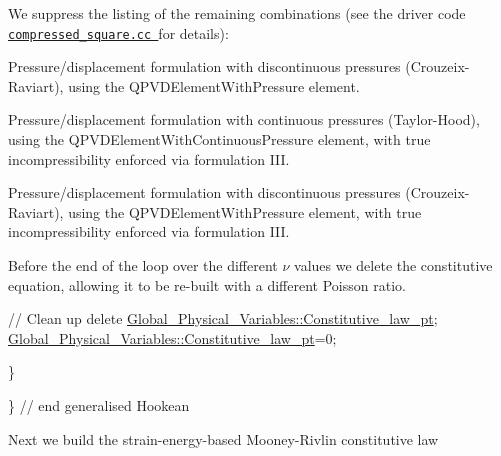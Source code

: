 We suppress the listing of the remaining combinations (see the driver code \href{../../../../demo_drivers/solid/compressed_square/compressed_square.cc}{\tt compressed\+\_\+square.\+cc }for details)\+:
\begin{DoxyItemize}
\item Pressure/displacement formulation with discontinuous pressures (Crouzeix-\/\+Raviart), using the {\ttfamily Q\+P\+V\+D\+Element\+With\+Pressure} element.
\item Pressure/displacement formulation with continuous pressures (Taylor-\/\+Hood), using the {\ttfamily Q\+P\+V\+D\+Element\+With\+Continuous\+Pressure} element, with true incompressibility enforced via formulation I\+II.
\item Pressure/displacement formulation with discontinuous pressures (Crouzeix-\/\+Raviart), using the {\ttfamily Q\+P\+V\+D\+Element\+With\+Pressure} element, with true incompressibility enforced via formulation I\+II.
\end{DoxyItemize}Before the end of the loop over the different $ \nu $ values we delete the constitutive equation, allowing it to be re-\/built with a different Poisson ratio.


\begin{DoxyCodeInclude}
    \textcolor{comment}{// Clean up}
    \textcolor{keyword}{delete} \hyperlink{namespaceGlobal__Physical__Variables_a2a37fb040c832ee7a086bb13bb02a100}{Global\_Physical\_Variables::Constitutive\_law\_pt};
    \hyperlink{namespaceGlobal__Physical__Variables_a2a37fb040c832ee7a086bb13bb02a100}{Global\_Physical\_Variables::Constitutive\_law\_pt}=0;
    
   \} 
 
 \} \textcolor{comment}{// end generalised Hookean}

\end{DoxyCodeInclude}


Next we build the strain-\/energy-\/based Mooney-\/\+Rivlin constitutive law


